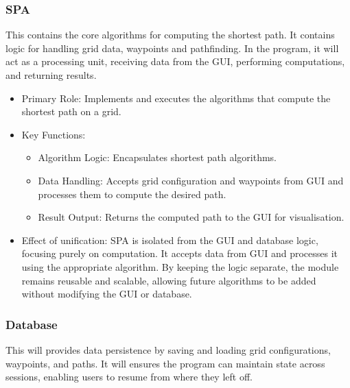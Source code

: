 \subsubsection{SPA}
This contains the core algorithms for computing the shortest path. It contains logic for handling grid data, waypoints and pathfinding. In the program, it will act as a processing unit, receiving data from the GUI, performing computations, and returning results.

\begin{itemize}
    \item Primary Role: Implements and executes the algorithms that compute the shortest path on a grid.
    \item Key Functions:
        \begin{itemize}
            \item Algorithm Logic: Encapsulates shortest path algorithms.
            \item Data Handling: Accepts grid configuration and waypoints from GUI and processes them to compute the desired path.
            \item Result Output: Returns the computed path to the GUI for visualisation.
        \end{itemize}
    \item Effect of unification: \newline
        SPA is isolated from the GUI and database logic, focusing purely on computation. It accepts data from GUI and processes it using the appropriate algorithm. By keeping the logic separate, the module remains reusable and scalable, allowing future algorithms to be added without modifying the GUI or database.
\end{itemize}



\subsubsection{Database}
This will provides data persistence by saving and loading grid configurations, waypoints, and paths. It will ensures the program can maintain state across sessions, enabling users to resume from where they left off.

